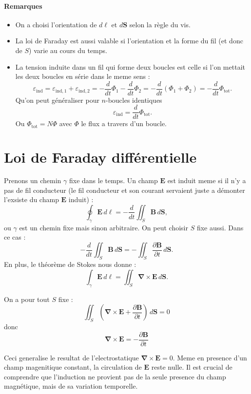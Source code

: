 \paragraph{Remarques}
\begin{itemize}
\item On a choisi l'orientation de $d\boldsymbol{\ell}$ et $d\boldsymbol{S}$ selon la règle du vis.
\item La loi de Faraday est aussi valable si l'orientation et la forme du fil (et donc de $S$) varie au cours du temps.
\item La tension induite dans un fil qui forme deux boucles est celle si l'on mettait les deux boucles en série dans le meme sens : 
$$
\varepsilon _{\mathrm{ind}}=\varepsilon _{\mathrm{ind},1} +\varepsilon _{\mathrm{ind},2}=-\frac{d}{dt} \Phi _{1}-\frac{d}{dt} \Phi_{2}=-\frac{d}{dt} (\Phi_{1}+\Phi_{2})=-\frac{d}{dt}\Phi _{\mathrm{t o t}}.
$$
Qu'on peut généraliser pour $n$-boucles identiques
$$
\varepsilon _{\mathrm{ind}}=\frac{d}{dt} \Phi _{\mathrm{ t o t}}.
$$
Ou $\Phi _{\mathrm{ t o t }}=N\Phi$ avec $\Phi$ le flux a travers d'un boucle.
\end{itemize}
\section{Loi de Faraday différentielle}
Prenons un chemin $\gamma$ fixe dans le temps. Un champ $\boldsymbol{E}$ est induit meme si il n'y a pas de fil conducteur (le fil conducteur et son courant servaient juste a démonter l'exsiste du champ $\boldsymbol{E}$ induit) : 
$$
\oint _{\gamma}\boldsymbol{E}\,d\boldsymbol{\ell}=-\frac{d}{dt} \iint _{S}\boldsymbol{B}\,d\boldsymbol{S},
$$
ou $\gamma$ est un chemin fixe mais sinon arbitraire. On peut choisir $S$ fixe aussi. Dans ce cas :
$$
-\frac{d}{dt} \iint _{S}\boldsymbol{B}\, d\boldsymbol{S}=-\iint _{S}\frac{ \partial \boldsymbol{B} }{ \partial t } \,d\boldsymbol{S}.
$$
En plus, le théorème de Stokes nous donne :
$$
\int _{\gamma}\boldsymbol{E}\,d\boldsymbol{\ell}=\iint _{S}\boldsymbol{\nabla}\times \boldsymbol{E}\,d\boldsymbol{S}.
$$
\begin{theorem}
On a pour tout $S$ fixe : 
$$
\iint _{S}\left( \boldsymbol{\nabla}\times \boldsymbol{E}+\frac{ \partial \boldsymbol{B} }{ \partial t }  \right)\,d\boldsymbol{S}=0
$$
donc
$$
\boldsymbol{\nabla}\times \boldsymbol{E}=-\frac{ \partial \boldsymbol{B} }{ \partial t} 
$$
\end{theorem}
\begin{remark}
Ceci generalise le resultat de l'electrostatique $\boldsymbol{\nabla}\times \boldsymbol{E}=0$. Meme en presence d'un champ magenitique constant, la circulation de $\boldsymbol{E}$ reste nulle. Il est crucial de comprendre que l'induction ne provient pas de la seule presence du champ magnétique, mais de sa variation temporelle.
\end{remark}
